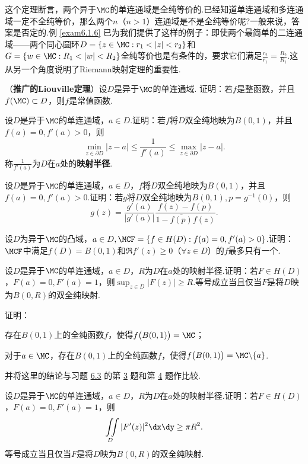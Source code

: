 这个定理断言，两个异于$\MC$的单连通域是全纯等价的.已经知道单连通域和多连通域一定不全纯等价，那么两个$n$（$n>1$）连通域是不是全纯等价呢?一般来说，答案是否定的.例 \ref{exam6.1.6} 已为我们提供了这样的例子：即使两个最简单的二连通域——两个同心圆环$D=\{z\in\MC:r_1<|z|<r_2\}$和$G=\{w\in\MC:R_1<|w| <R_2\}$全纯等价也是有条件的，要求它们满足$\frac{r_2}{r_1}=\frac{R_2}{R_1}$.这从另一个角度说明了Riemann映射定理的重要性.

\begin{xiti}\hypertarget{xiti7.2}{}
\item （\textbf{推广的Liouville定理}）设$D$是异于$\MC$的单连通域. 证明：若$f$是整函数，并且$f(\MC)\subset D$，则$f$是常值函数.
\item 设$D$是异于$\MC$的单连通域，$a\in D$.证明：若$f$将$D$双全纯地映为$B(0,1)$，并且$f(a)=0,f'(a)>0$，则
    \[\min_{z\in\partial D}|z-a|\le\frac1{f'(a)}\le\max_{z\in\partial D}|z-a|.\]
称$\frac1{f'(a)}$为$D$在$a$处的\textbf{映射半径}.
\item 设$D$是异于$\MC$的单连通域，$a\in D$，$f$将$D$双全纯地映为$B(0,1)$，并且$f(a)=0,f'(a)>0$.证明：若$g$将$D$双全纯地映为$B(0,1),p=g^{-1}(0)$，则
    \[g(z)=\frac{g'(a)}{|g'(a)|}\frac{f(z)-f(p)}{1-\bar{f(p)}f(z)}.\]
\item 设$D$为异于$\MC$的凸域，$a\in D,\MCF=\{f\in H(D):f(a)=0,f'(a)>0\}$.证明：$\MCF$中满足$f(D)=B(0,1)$和$\Re f'(z)\ge0$（$\forall z\in D$）的$f$最多只有一个.
\item 设$D$是异于$\MC$的单连通域，$a\in D$，$R$为$D$在$a$处的映射半径.证明：若$F\in H(D) $，$F(a)=0,F'(a)=1$，则$\sup_{z\in D}|F(z)|\ge R$.等号成立当且仅当$F$是将$D$映为$B(0,R)$的双全纯映射.
\item 证明：
\begin{enuma}
  \item 存在$B(0,1)$上的全纯函数$f$，使得$f\big(B(0,1)\big)=\MC$；
  \item 对于$a\in \MC$，存在$B(0,1)$上的全纯函数$f$，使得$f\big(B(0,1)\big)=\MC\backslash\{a\}$.
\end{enuma}
      并将这里的结论与习题 \hyperlink{xiti6.3}{6.3} 的第 \hyperlink{xiti6.3.3}{3} 题和第 \hyperlink{xiti6.3.3}{4} 题作比较.
\item 设$D$是异于$\MC$的单连通域，$a\in D$，$R$为$D$在$a$处的映射半径.证明：若$F\in H(D)$，$F(a)=0,F'(a)=1$，则
    \[\iint\limits_D|F'(z)|^2\dx\dy\ge\pi R^2.\]
等号成立当且仅当$F$是将$D$映为$B(0,R)$的双全纯映射.
\end{xiti}

